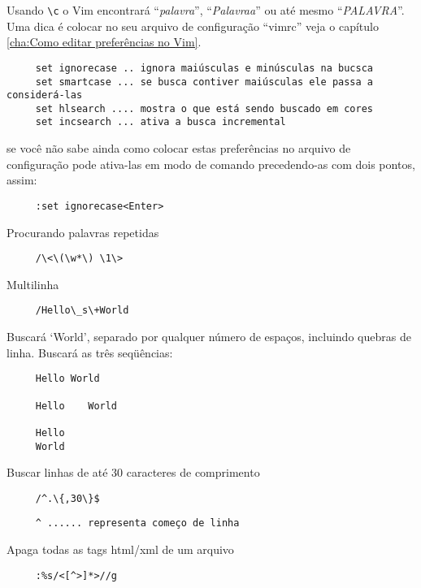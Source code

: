 Usando \verb|\c| o Vim encontrará ``{\em{palavra}}'', ``{\em{Palavraa}}'' ou
até mesmo ``{\em{PALAVRA}}''. Uma dica é colocar no seu arquivo de
configuração ``vimrc'' veja o capítulo \ref{cha:Como editar preferências no Vim}.

\begin{verbatim}
     set ignorecase .. ignora maiúsculas e minúsculas na bucsca
     set smartcase ... se busca contiver maiúsculas ele passa a considerá-las
     set hlsearch .... mostra o que está sendo buscado em cores
     set incsearch ... ativa a busca incremental
\end{verbatim}

se você não sabe ainda como colocar estas preferências no arquivo de configuração pode
ativa-las em modo de comando precedendo-as com dois pontos, assim:

\begin{verbatim}
     :set ignorecase<Enter>
\end{verbatim}

Procurando palavras repetidas

\begin{verbatim}
     /\<\(\w*\) \1\>
\end{verbatim}

Multilinha

\begin{verbatim}
     /Hello\_s\+World
\end{verbatim}

Buscará `World', separado por qualquer número de espaços,
incluindo quebras de linha. Buscará as três seqüências:

\begin{verbatim}
     Hello World
     
     Hello    World
     
     Hello
     World
\end{verbatim}

Buscar linhas de até 30 caracteres de comprimento

\begin{verbatim}
     /^.\{,30\}$
\end{verbatim}

\begin{verbatim}
     ^ ...... representa começo de linha
\end{verbatim}

Apaga todas as tags html/xml de um arquivo

\begin{verbatim}
     :%s/<[^>]*>//g
\end{verbatim}

